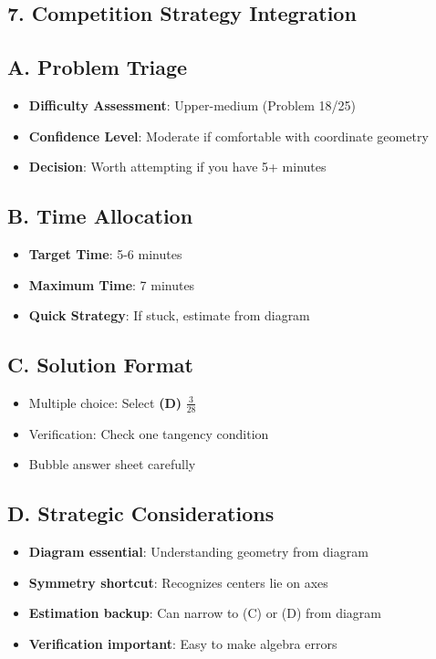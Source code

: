 \documentclass[11pt]{article}
\begin{document}
\begin{competitionbox}
\section*{7. Competition Strategy Integration}

\subsection*{A. Problem Triage}
\begin{itemize}[leftmargin=*]
    \item \textbf{Difficulty Assessment}: Upper-medium (Problem 18/25)
    \item \textbf{Confidence Level}: Moderate if comfortable with coordinate geometry
    \item \textbf{Decision}: Worth attempting if you have 5+ minutes
\end{itemize}

\subsection*{B. Time Allocation}
\begin{itemize}[leftmargin=*]
    \item \textbf{Target Time}: 5-6 minutes
    \item \textbf{Maximum Time}: 7 minutes
    \item \textbf{Quick Strategy}: If stuck, estimate from diagram
\end{itemize}

\subsection*{C. Solution Format}
\begin{itemize}[leftmargin=*]
    \item Multiple choice: Select \textbf{(D)} $\frac{3}{28}$
    \item Verification: Check one tangency condition
    \item Bubble answer sheet carefully
\end{itemize}

\subsection*{D. Strategic Considerations}
\begin{itemize}[leftmargin=*]
    \item \textbf{Diagram essential}: Understanding geometry from diagram
    \item \textbf{Symmetry shortcut}: Recognizes centers lie on axes
    \item \textbf{Estimation backup}: Can narrow to (C) or (D) from diagram
    \item \textbf{Verification important}: Easy to make algebra errors
\end{itemize}
\end{competitionbox}
\end{document}
